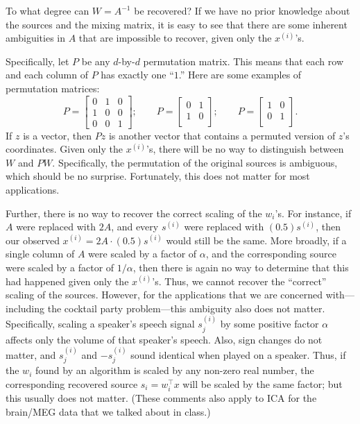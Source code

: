 \vspace{1cm}
To what degree can $W = A^{-1}$ be recovered? If we have no prior knowledge
about the sources and the mixing matrix, it is easy to see that there are some
inherent ambiguities in $A$ that are impossible to recover, given only the $x^{(i)}$'s.

Specifically, let $P$ be any $d$-by-$d$ permutation matrix. This means that
each row and each column of $P$ has exactly one ``$1$.'' Here are some examples
of permutation matrices:
\[
P = \begin{bmatrix}
    0 & 1 & 0\\
    1 & 0 & 0\\
    0 & 0 & 1
\end{bmatrix}; \qquad
P = \begin{bmatrix}
    0 & 1\\
    1 & 0\\
\end{bmatrix}; \qquad
P = \begin{bmatrix}
    1 & 0\\
    0 & 1\\
\end{bmatrix}.
\]
If $z$ is a vector, then $Pz$ is another vector that contains a permuted version
of $z$'s coordinates. Given only the $x^{(i)}$'s, there will be no way to distinguish
between $W$ and $PW$. Specifically, the permutation of the original sources is
ambiguous, which should be no surprise. Fortunately, this does not matter
for most applications.

Further, there is no way to recover the correct scaling of the $w_i$'s. For
instance, if $A$ were replaced with $2A$, and every $s^{(i)}$ were replaced with $(0.5)s^{(i)}$,
then our observed $x^{(i)} = 2A \cdot (0.5)s^{(i)}$ would still be the same. More broadly,
if a single column of $A$ were scaled by a factor of $\alpha$, and the corresponding
source were scaled by a factor of $1/\alpha$, then there is again no way to determine
that this had happened given only the $x^{(i)}$'s. Thus, we cannot recover the
``correct'' scaling of the sources. However, for the applications that we are
concerned with---including the cocktail party problem---this ambiguity also
does not matter. Specifically, scaling a speaker's speech signal $s^{(i)}_j$
by some positive factor $\alpha$ affects only the volume of that speaker's speech. Also, sign
changes do not matter, and $s^{(i)}_j$
and $-s^{(i)}_j$ sound identical when played on a
speaker. Thus, if the $w_i$ found by an algorithm is scaled by any non-zero real
number, the corresponding recovered source $s_i = w^\top_i x$ will be scaled by the
same factor; but this usually does not matter. (These comments also apply
to ICA for the brain/MEG data that we talked about in class.)

